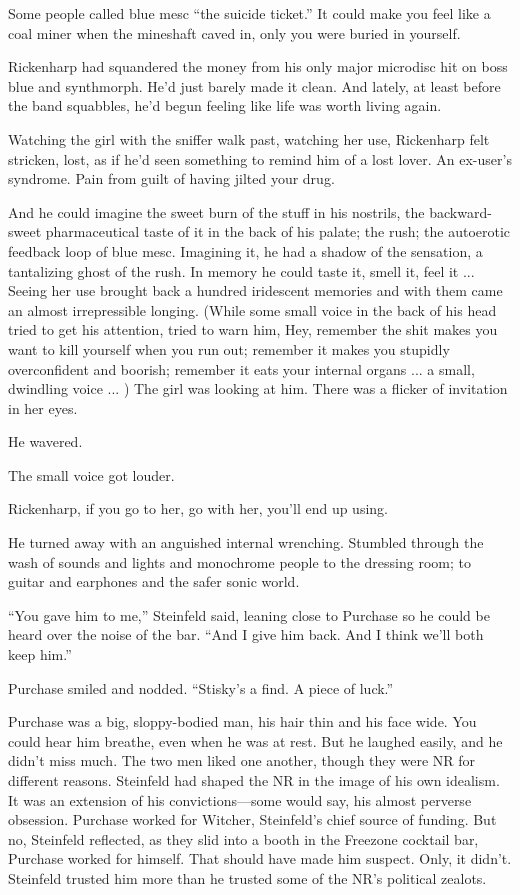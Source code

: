 Some people called blue mesc ``the suicide ticket.'' It could make you feel like a coal miner when the mineshaft caved in, only you were buried in yourself.

Rickenharp had squandered the money from his only major microdisc hit on boss blue and synthmorph. He'd just barely made it clean. And lately, at least before the band squabbles, he'd begun feeling like life was worth living again.

Watching the girl with the sniffer walk past, watching her use, Rickenharp felt stricken, lost, as if he'd seen something to remind him of a lost lover. An ex-user's syndrome. Pain from guilt of having jilted your drug.

And he could imagine the sweet burn of the stuff in his nostrils, the backward-sweet pharmaceutical taste of it in the back of his palate; the rush; the autoerotic feedback loop of blue mesc. Imagining it, he had a shadow of the sensation, a tantalizing ghost of the rush. In memory he could taste it, smell it, feel it ... Seeing her use brought back a hundred iridescent memories and with them came an almost irrepressible longing. (While some small voice in the back of his head tried to get his attention, tried to warn him, Hey, remember the shit makes you want to kill yourself when you run out; remember it makes you stupidly overconfident and boorish; remember it eats your internal organs ... a small, dwindling voice ... ) The girl was looking at him. There was a flicker of invitation in her eyes.

He wavered.

The small voice got louder.

Rickenharp, if you go to her, go with her, you'll end up using.

He turned away with an anguished internal wrenching. Stumbled through the wash of sounds and lights and monochrome people to the dressing room; to guitar and earphones and the safer sonic world.

``You gave him to me,'' Steinfeld said, leaning close to Purchase so he could be heard over the noise of the bar. ``And I give him back. And I think we'll both keep him.''

Purchase smiled and nodded. ``Stisky's a find. A piece of luck.''

Purchase was a big, sloppy-bodied man, his hair thin and his face wide. You could hear him breathe, even when he was at rest. But he laughed easily, and he didn't miss much. The two men liked one another, though they were NR for different reasons. Steinfeld had shaped the NR in the image of his own idealism. It was an extension of his convictions—some would say, his almost perverse obsession. Purchase worked for Witcher, Steinfeld's chief source of funding. But no, Steinfeld reflected, as they slid into a booth in the Freezone cocktail bar, Purchase worked for himself. That should have made him suspect. Only, it didn't. Steinfeld trusted him more than he trusted some of the NR's political zealots.

